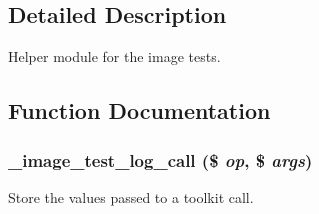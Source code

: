 \subsection{Detailed Description}
Helper module for the image tests. 

\subsection{Function Documentation}
\hypertarget{image__test_8module_a2cf5b9a663a0483ddc64f8e9a4c3b318}{
\subsubsection[{\_\-image\_\-test\_\-log\_\-call}]{\setlength{\rightskip}{0pt plus 5cm}\_\-image\_\-test\_\-log\_\-call (\$ {\em op}, \/  \$ {\em args})}}
\label{image__test_8module_a2cf5b9a663a0483ddc64f8e9a4c3b318}
Store the values passed to a toolkit call.


